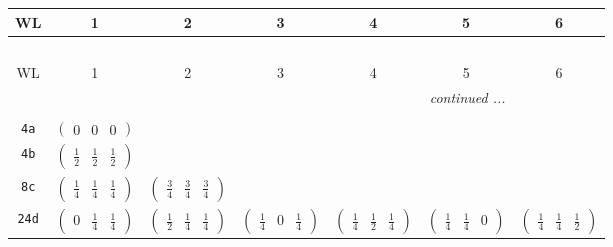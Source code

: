 \documentclass[fleqn,9pt,landscape]{jsarticle}
\begin{document}
\begin{center}
\renewcommand{\arraystretch}{1.2}
\begin{longtable}{ccccccc}
 \hline \hline
WL & 1 & 2 & 3 & 4 & 5 & 6 \\ \hline \endfirsthead

\multicolumn{6}{l}{\tablename\ \thetable{}} \\
 \hline \hline
WL & 1 & 2 & 3 & 4 & 5 & 6 \\ \hline \endhead

 \hline \hline
\multicolumn{6}{r}{\footnotesize\it continued ...} \\ \endfoot

 \hline \hline
\multicolumn{6}{r}{} \\ \endlastfoot

{\tt 4a} & $ \begin{pmatrix} 0 & 0 & 0 \end{pmatrix} $ & $  $ & $  $ & $  $ & $  $ & $  $ \\ \hline
{\tt 4b} & $ \begin{pmatrix} \frac{1}{2} & \frac{1}{2} & \frac{1}{2} \end{pmatrix} $ & $  $ & $  $ & $  $ & $  $ & $  $ \\ \hline
{\tt 8c} & $ \begin{pmatrix} \frac{1}{4} & \frac{1}{4} & \frac{1}{4} \end{pmatrix} $ & $ \begin{pmatrix} \frac{3}{4} & \frac{3}{4} & \frac{3}{4} \end{pmatrix} $ & $  $ & $  $ & $  $ & $  $ \\ \hline
{\tt 24d} & $ \begin{pmatrix} 0 & \frac{1}{4} & \frac{1}{4} \end{pmatrix} $ & $ \begin{pmatrix} \frac{1}{2} & \frac{1}{4} & \frac{1}{4} \end{pmatrix} $ & $ \begin{pmatrix} \frac{1}{4} & 0 & \frac{1}{4} \end{pmatrix} $ & $ \begin{pmatrix} \frac{1}{4} & \frac{1}{2} & \frac{1}{4} \end{pmatrix} $ & $ \begin{pmatrix} \frac{1}{4} & \frac{1}{4} & 0 \end{pmatrix} $ & $ \begin{pmatrix} \frac{1}{4} & \frac{1}{4} & \frac{1}{2} \end{pmatrix} $ \\ \hline

\end{longtable}
\end{center}
\end{document}
